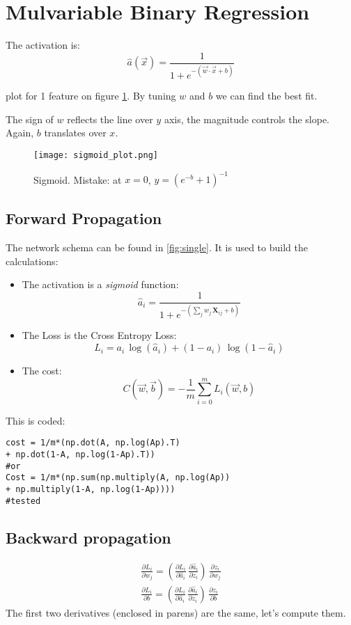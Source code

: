 \section{Mulvariable Binary Regression}
The activation is:
\[
  \hat{a}(\vec{x})= \frac{1}{1+e^{-(\vec{w}\cdot{}\vec{x}+b)}}
\]

plot for 1 feature on figure \ref{fig:sigmoid}. By tuning $w$ and $b$  we can find the best fit. 

The sign of $w$ reflects the line over $y$ axis, the magnitude controls the slope. Again, $b$ translates over $x$.

\begin{figure}[h]
 \centering
 \texttt{[image: sigmoid\_plot.png]}
  \caption{Sigmoid. Mistake: at $x=0$, $y=(e^{-b}+1)^{-1}$} \label{fig:sigmoid}
\end{figure}

\subsection{Forward Propagation}
The network schema can be found in \ref{fig:single}. It is used to build the calculations:

\begin{itemize}
  \item The activation is a \textit{sigmoid} function:
\[
  \hat{a}_i = \frac{1}{1+e^{-(\sum_j w_j\, \mathbf{X}_{ij} + b)}}
\]

  \item The Loss is the Cross Entropy Loss:
\[
  L_i = a_i\,\log(\hat{a}_i) + (1-a_i)\,\log(1-\hat{a}_i)
\]

\item The cost:
\[
  C(\vec{w}, \vec{b}) = -\frac{1}{m}\sum_{i=0}^m L_i(\vec{w}, b)
\]
\end{itemize}
This is coded:
\begin{verbatim}
cost = 1/m*(np.dot(A, np.log(Ap).T) 
+ np.dot(1-A, np.log(1-Ap).T))
#or
Cost = 1/m*(np.sum(np.multiply(A, np.log(Ap)) 
+ np.multiply(1-A, np.log(1-Ap))))
#tested
\end{verbatim}

\subsection{Backward propagation}

\begin{align}
  \frac{\partial L_i}{\partial w_j} = 
  \left(\frac{\partial L_i}{\partial \hat{a}_i}\, \frac{\partial \hat{a}_i}{\partial z_i}\right)\,\frac{\partial z_i}{\partial w_j}\\
  \frac{\partial L_i}{\partial b} = 
  \left(\frac{\partial L_i}{\partial \hat{a}_i}\,\frac{\partial \hat{a}_i}{\partial z_i}\right)\,\frac{\partial z_i}{\partial b}
\end{align}
The first two derivatives (enclosed in parens) are the same, let's compute them.

